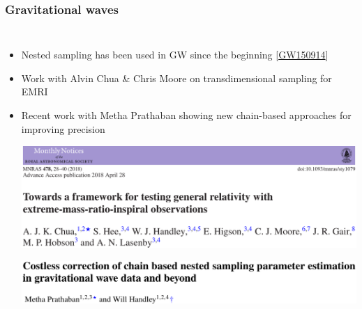 \documentclass[aspectratio=169]{beamer}
\begin{document}
\begin{frame}
    \frametitle{Gravitational waves}
    \begin{columns}
        \begin{itemize}
            \item Nested sampling has been used in GW since the beginning [\textcolor{C0}{\href{https://arxiv.org/abs/1602.03840}{GW150914}}]
            \item Work with Alvin Chua \& Chris Moore on transdimensional sampling for EMRI~
            \item Recent work with Metha Prathaban showing new chain-based approaches for improving precision 

                \includegraphics[width=\textwidth]{figures/gw_chua.pdf}

                \vspace{8pt}
                \includegraphics[width=\textwidth]{figures/gw_prathaban.pdf}
        \end{itemize}
        \vspace{4pt}


\end{columns}
\end{frame}
\end{document}

